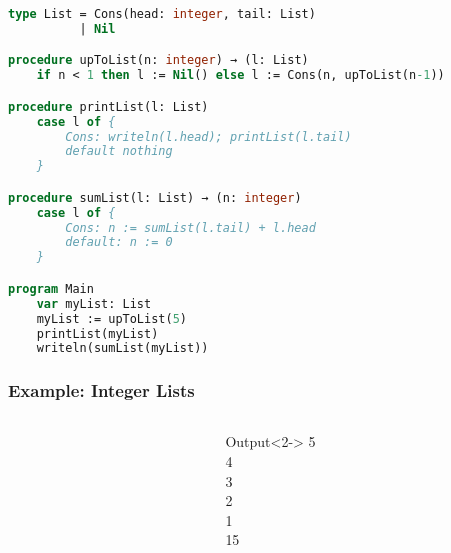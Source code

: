 \documentclass{beamer}
\begin{document}
\begin{lrbox}{\exampleList}
\begin{lstlisting}[language=Pascal, basicstyle=\tiny]
type List = Cons(head: integer, tail: List)
          | Nil

procedure upToList(n: integer) → (l: List)
    if n < 1 then l := Nil() else l := Cons(n, upToList(n-1))

procedure printList(l: List)
    case l of {
        Cons: writeln(l.head); printList(l.tail)
        default nothing
    }

procedure sumList(l: List) → (n: integer)
    case l of {
        Cons: n := sumList(l.tail) + l.head
        default: n := 0
    }

program Main
    var myList: List
    myList := upToList(5)
    printList(myList)
    writeln(sumList(myList))
\end{lstlisting}
\end{lrbox}

\begin{frame}
\frametitle{Example: Integer Lists}
    \begin{columns}[T,onlytextwidth]
        \begin{column}{.8\textwidth}
            \begin{minipage}{\textwidth}
                \usebox{\exampleList}
            \end{minipage}
        \end{column}
        \begin{column}{.2\textwidth}
            \begin{onlyenv}
                \begin{minipage}{\textwidth}
                    \begin{block}{Output}<2->
                        5\\
                        4\\
                        3\\
                        2\\
                        1\\
                        15
                    \end{block}
                \end{minipage}
            \end{onlyenv}
        \end{column}
    \end{columns}
\end{frame}
\end{document}
